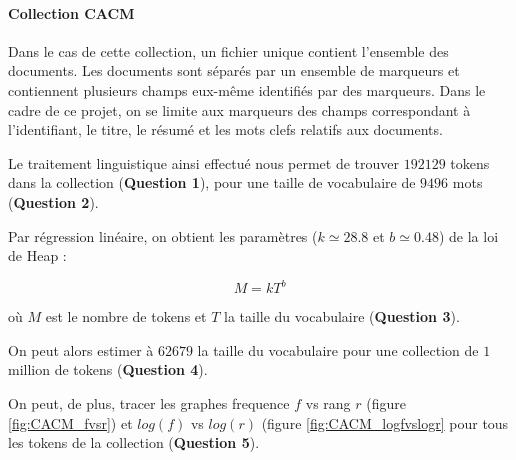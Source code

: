 \documentclass[12pt,a4paper]{article}
\begin{document}
\paragraph{Collection CACM} Dans le cas de cette collection, un fichier unique contient l'ensemble des documents. Les documents sont séparés par un ensemble de marqueurs et contiennent plusieurs champs eux-même identifiés par des marqueurs. Dans le cadre de ce projet, on se limite aux marqueurs des champs correspondant à l'identifiant, le titre, le résumé et les mots clefs relatifs aux documents.

Le traitement linguistique ainsi effectué nous permet de trouver $192129$ tokens dans la collection (\textbf{Question 1}), pour une taille de vocabulaire de $9496$ mots (\textbf{Question 2}).

Par régression linéaire, on obtient les paramètres ($k \simeq 28.8$ et $b \simeq 0.48$) de la loi de Heap :

\[ M =  kT^b \]

où $M$ est le nombre de tokens et $T$ la taille du vocabulaire (\textbf{Question 3}).

On peut alors estimer à $62679$ la taille du vocabulaire pour une collection de $1$ million de tokens (\textbf{Question 4}).

On peut, de plus, tracer les graphes frequence $f$ vs rang $r$ (figure \ref{fig:CACM_fvsr}) et $log(f)$ vs $log(r)$ (figure \ref{fig:CACM_logfvslogr} pour tous les tokens de la collection (\textbf{Question 5}).
\end{document}
